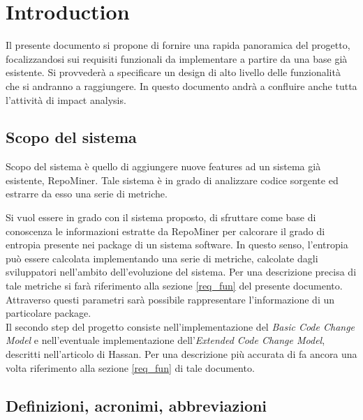 \chapter{Introduction}
Il presente documento si propone di fornire una rapida panoramica del progetto, focalizzandosi sui requisiti funzionali da implementare a partire da una base già esistente. Si provvederà a specificare un design di alto livello delle funzionalità che si andranno a raggiungere. In questo documento andrà a confluire anche tutta l'attività di impact analysis.

\section{Scopo del sistema}
Scopo del sistema è quello di aggiungere nuove features ad un sistema già esistente, RepoMiner. Tale sistema è in grado di analizzare codice sorgente ed estrarre da esso una serie di metriche. 

Si vuol essere in grado con il sistema proposto, di sfruttare come base di conoscenza le informazioni estratte da RepoMiner per calcorare il grado di entropia presente nei package di un sistema software. In questo senso, l'entropia può essere calcolata implementando una serie di metriche, calcolate dagli sviluppatori nell'ambito dell'evoluzione del sistema. Per una descrizione precisa di tale metriche si farà riferimento alla sezione \ref{req_fun} del presente documento. Attraverso questi parametri sarà possibile rappresentare l'informazione di un particolare package.\\

Il secondo step del progetto consiste nell'implementazione del \textit{Basic Code Change Model} e nell'eventuale implementazione dell'\textit{Extended Code Change Model}, descritti nell'articolo di Hassan\cite{hassan2009predicting}. Per una descrizione più accurata di fa ancora una volta riferimento alla sezione \ref{req_fun} di tale documento.

\section{Definizioni, acronimi, abbreviazioni}

